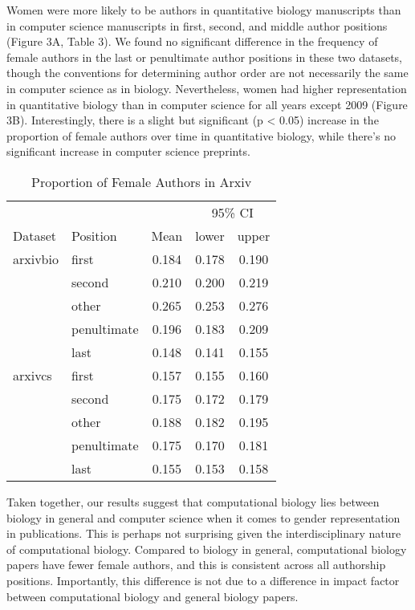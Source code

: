 \documentclass[10pt,letterpaper]{article}
\begin{document}
\begin{flushleft}
Women were more likely to be authors in quantitative biology manuscripts than in computer science manuscripts in first, second, and middle author positions (Figure 3A, Table 3). We found no significant difference in the frequency of female authors in the last or penultimate author positions in these two datasets, though the conventions for determining author order are not necessarily the same in computer science as in biology. Nevertheless, women had higher representation in quantitative biology than in computer science for all years except 2009 (Figure 3B). Interestingly, there is a slight but significant (p < 0.05) increase in the proportion of female authors over time in quantitative biology, while there’s no significant increase in computer science preprints.

\begin{table}[]
\centering
\caption{Proportion of Female Authors in Arxiv}
\label{Table 3}
\begin{tabular}{llccc}
\toprule
        &                  &       & \multicolumn{2}{c}{95\% CI} \\
\cmidrule(r){4-5}
Dataset      & Position    & Mean  & lower        & upper        \\
\midrule
arxivbio     & first       & 0.184 & 0.178        & 0.190        \\
             & second      & 0.210 & 0.200        & 0.219        \\
             & other       & 0.265 & 0.253        & 0.276        \\
             & penultimate & 0.196 & 0.183        & 0.209        \\
             & last        & 0.148 & 0.141        & 0.155        \\
arxivcs      & first       & 0.157 & 0.155        & 0.160        \\
             & second      & 0.175 & 0.172        & 0.179        \\
             & other       & 0.188 & 0.182        & 0.195        \\
             & penultimate & 0.175 & 0.170        & 0.181        \\
             & last        & 0.155 & 0.153        & 0.158        \\
\bottomrule
\end{tabular}
\end{table}

Taken together, our results suggest that computational biology lies between biology in general and computer science when it comes to gender representation in publications. This is perhaps not surprising given the interdisciplinary nature of computational biology. Compared to biology in general, computational biology papers have fewer female authors, and this is consistent across all authorship positions. Importantly, this difference is not due to a difference in impact factor between computational biology and general biology papers.


\end{flushleft}
\end{document}
